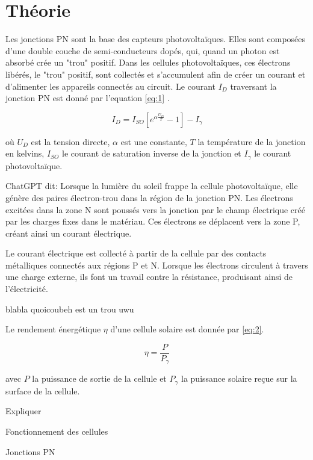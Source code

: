 \section{Théorie}

Les jonctions PN sont la base des capteurs photovoltaïques. Elles sont composées d'une double couche de semi-conducteurs dopés, qui, quand un photon est absorbé crée un "trou" positif.
Dans les cellules photovoltaïques, ces électrons libérés, le "trou" positif, sont collectés et s'accumulent afin de créer un courant et d'alimenter les appareils connectés au circuit.
Le courant \(I_D\) traversant la jonction PN est donné par l'equation \ref{eq:1} \cite{notice}.

\begin{equation}
    I_D = I_{SO}[e^{\alpha\frac{U_D}{T}} - 1] - I_\gamma
    \label{eq:1}
\end{equation}

où \(U_D\) est la tension directe, \(\alpha\) est une constante, \(T\) la température de la jonction en kelvins, \(I_{SO}\) le courant de saturation inverse de la jonction et \(I_\gamma\) le courant photovoltaïque.

ChatGPT dit:
Lorsque la lumière du soleil frappe la cellule photovoltaïque, elle génère des paires électron-trou dans la région de la jonction PN. Les électrons excitées dans la zone N sont poussés vers la jonction par le champ électrique créé par les charges fixes dans le matériau. Ces électrons se déplacent vers la zone P, créant ainsi un courant électrique.

Le courant électrique est collecté à partir de la cellule par des contacts métalliques connectés aux régions P et N. Lorsque les électrons circulent à travers une charge externe, ils font un travail contre la résistance, produisant ainsi de l'électricité.

blabla quoicoubeh est un trou uwu

Le rendement énergétique \(\eta\) d'une cellule solaire est donnée par \ref{eq:2}.

\begin{equation}
    \eta = \frac{P}{P_\gamma}
    \label{eq:2}
\end{equation}

avec \(P\) la puissance de sortie de la cellule et \(P_\gamma\) la puissance solaire reçue sur la surface de la cellule.

Expliquer

Fonctionnement des cellules

Jonctions PN

